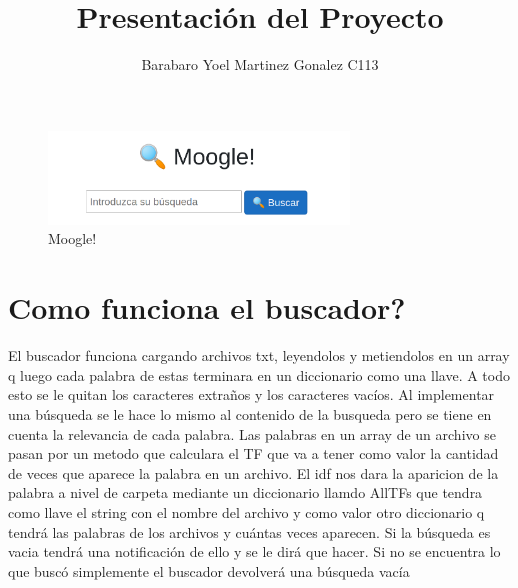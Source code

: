 \documentclass[a4paper,12pt]{article}
\begin{document}
\title{Presentación del Proyecto}
\author{Barabaro Yoel Martinez Gonalez C113}

\maketitle
\begin{figure}[h]
	\center
	\includegraphics[width=8cm]{moogle.png}
	\caption{Moogle!}
	\label{fig:logo}
\end{figure}
\section{Como funciona el buscador?}



\begin{flushleft}
El buscador funciona cargando archivos txt, leyendolos y metiendolos en un array q luego cada palabra de estas terminara en un diccionario como una llave. A todo esto se le quitan los caracteres extraños y los caracteres vacíos. Al implementar una búsqueda se le hace lo mismo al contenido de la busqueda pero se tiene en cuenta la relevancia de cada palabra. Las palabras en un array de un archivo se pasan por un metodo que calculara el TF que va a tener como valor la cantidad de veces que aparece la palabra en un archivo. El idf nos dara la aparicion de la palabra a nivel de carpeta mediante un diccionario llamdo AllTFs que tendra como llave el string con el nombre del archivo y como valor otro diccionario q tendrá las palabras de los archivos y cuántas veces aparecen. Si la búsqueda es vacia tendrá una notificación de ello y se le dirá que hacer. Si no se encuentra lo que buscó simplemente el buscador devolverá una búsqueda vacía


\end{flushleft}
\end{document}
